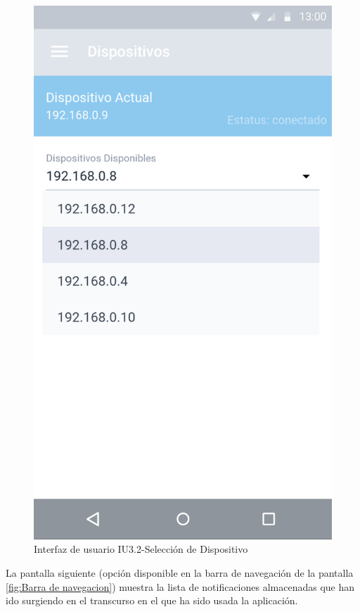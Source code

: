 \begin{figure}[H]
	\centering
	\includegraphics[scale=0.70]{Capitulo4/software/submodulos/images/seleccion_disp.png}
	\caption{Interfaz de usuario IU3.2-Selección de Dispositivo}
	\label{fig:Seleccion de Disposotivo}
\end{figure}

La pantalla siguiente (opción disponible en la barra de navegación de la pantalla \ref{fig:Barra de navegacion}) muestra la lista de notificaciones almacenadas que han ido surgiendo en el transcurso en el que ha sido usada la aplicación.

